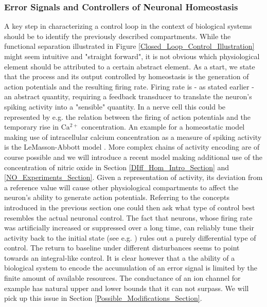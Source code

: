 \documentclass[10pt,a4paper]{article}
\begin{document}
\subsubsection{Error Signals and Controllers of Neuronal Homeostasis}
A key step in characterizing a control loop in the context of biological systems should be to identify the previously described compartments. While the functional separation illustrated in Figure \ref{Closed_Loop_Control_Illustration} might seem intuitive and "straight forward", it is not obvious which physiological element should be attributed to a certain abstract element.
As a start, we state that the process and its output controlled by homeostasis is the generation of action potentials and the resulting firing rate. Firing rate is - as stated earlier - an abstract quantity, requiring a feedback transducer to translate the neuron's spiking activity into a "sensible" quantity. In a nerve cell this could be represented by e.g. the relation between the firing of action potentials and the temporary rise in $\mathrm{Ca^{2+}}$ concentration. An example for a homeostatic model making use of intracellular calcium concentration as a measure of spiking activity is the LeMasson-Abbott model \cite{LeMasson_1993}. More complex chains of activity encoding are of course possible and we will introduce a recent model making additional use of the concentration of nitric oxide in Section \ref{DIff_Hom_Intro_Section} and \ref{NO_Experiments_Section}. Given a representation of activity, its deviation from a reference value will cause other physiological compartments to affect the neuron's ability to generate action potentials. Referring to the concepts introduced in the previous section one could then ask what type of control best resembles the actual neuronal control. The fact that neurons, whose firing rate was artificially increased or suppressed over a long time, can reliably tune their activity back to the initial state (see e.g. \cite{Burrone_2002}) rules out a purely differential type of control. The return to baseline under different disturbances seems to point towards an integral-like control. It is clear however that a the ability of a biological system to encode the accumulation of an error signal is limited by the finite amount of available resources. The conductance of an ion channel for example has natural upper and lower bounds that it can not surpass. We will pick up this issue in Section \ref{Possible_Modifications_Section}.
\end{document}

